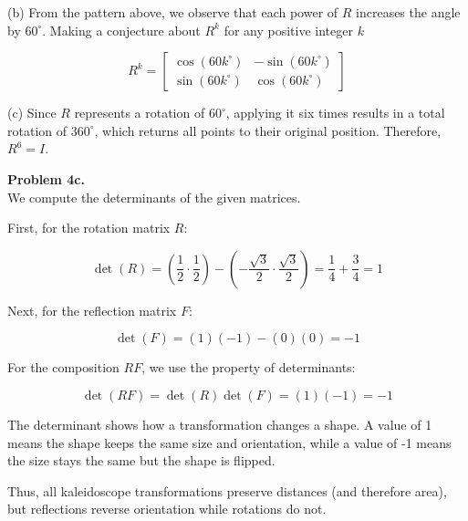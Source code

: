 \documentclass{ximera}
\begin{document}
\begin{problem}
  \vspace{0.3cm}

(b) From the pattern above, we observe that each power of $R$ increases the angle by $60^\circ$. Making a conjecture about $R^k$ for any positive integer $k$

  \vspace{0.3cm}

$$  R^k =
\begin{bmatrix}
\cos(60k^\circ) & -\sin(60k^\circ) \\
\sin(60k^\circ) & \cos(60k^\circ)
\end{bmatrix}$$

  \vspace{0.3cm}

(c) Since $R$ represents a rotation of $60^\circ$, applying it six times results in a total rotation of $360^\circ$, which returns all points to their original position. Therefore, $R^6 = I$.

   \vspace{0.7cm}

\textbf{Problem 4c.}\\
  
We compute the determinants of the given matrices.

First, for the rotation matrix $R$:

\[
\det(R) =
\left(\frac{1}{2} \cdot \frac{1}{2}\right)
-
\left(-\frac{\sqrt{3}}{2} \cdot \frac{\sqrt{3}}{2}\right)
= \frac{1}{4} + \frac{3}{4} = 1
\]

Next, for the reflection matrix $F$:

\[
\det(F) = (1)(-1) - (0)(0) = -1
\]

For the composition $RF$, we use the property of determinants:

\[
\det(RF) = \det(R)\det(F) = (1)(-1) = -1
\]

  \vspace{0.3cm}

The determinant shows how a transformation changes a shape. A value of 1 means the shape keeps the same size and orientation, while a value of -1 means the size stays the same but the shape is flipped.

Thus, all kaleidoscope transformations preserve distances (and therefore area), but reflections reverse orientation while rotations do not.

\end{problem}
\end{document}

